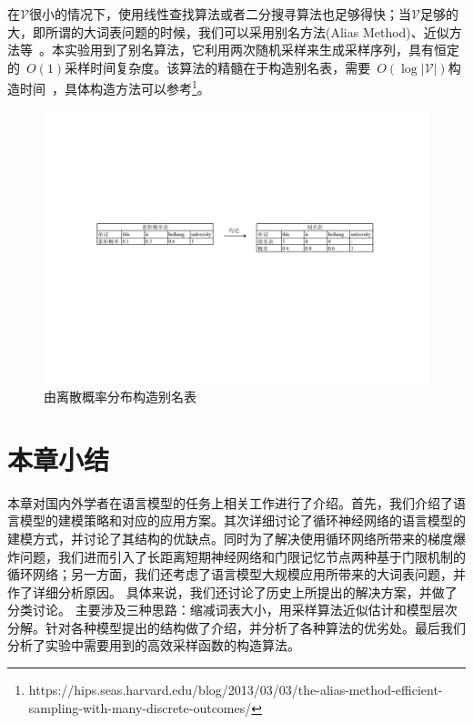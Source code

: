 在$\mathcal{V}$很小的情况下，使用线性查找算法或者二分搜寻算法也足够得快；当$\mathcal{V}$足够的大，即所谓的大词表问题的时候，我们可以采用别名方法(Alias Method)、近似方法等~。本实验用到了别名算法，它利用两次随机采样来生成采样序列，具有恒定的~$O(1)$采样时间复杂度。该算法的精髓在于构造别名表，需要~$O(\log |\mathcal{V}|)$构造时间~，具体构造方法可以参考\footnote{https://hips.seas.harvard.edu/blog/2013/03/03/the-alias-method-efficient-sampling-with-many-discrete-outcomes/}。

\begin{figure}[!ht]
  \centering
\includegraphics[width=1\linewidth]{./figures/alias.pdf}
\caption{由离散概率分布构造别名表}\label{fig:alias}
\end{figure}

\section{本章小结}
本章对国内外学者在语言模型的任务上相关工作进行了介绍。首先，我们介绍了语言模型的建模策略和对应的应用方案。其次详细讨论了循环神经网络的语言模型的建模方式，并讨论了其结构的优缺点。同时为了解决使用循环网络所带来的梯度爆炸问题，我们进而引入了长距离短期神经网络和门限记忆节点两种基于门限机制的循环网络；另一方面，我们还考虑了语言模型大规模应用所带来的大词表问题，并作了详细分析原因。
具体来说，我们还讨论了历史上所提出的解决方案，并做了分类讨论。
主要涉及三种思路：缩减词表大小，用采样算法近似估计和模型层次分解。针对各种模型提出的结构做了介绍，并分析了各种算法的优劣处。最后我们分析了实验中需要用到的高效采样函数的构造算法。